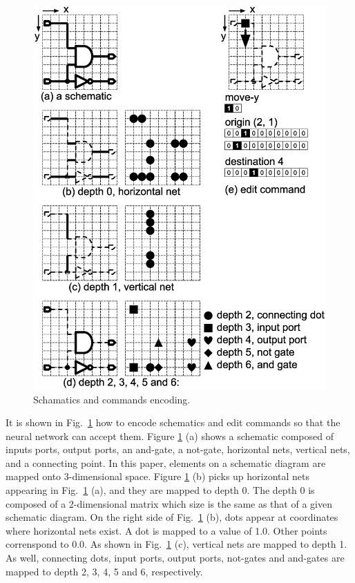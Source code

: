 \documentclass[twocolumn]{article}
\begin{document}
\begin{figure}[!tp]
 \begin{center}
  \begin{minipage}{\hsize}
   \includegraphics[width=\hsize]{fig/encode_02.eps}
   \caption{Schamatics and commands encoding.}
   \label{fig:encode}
  \end{minipage}
 \end{center}
\end{figure}

It is shown in Fig.\ \ref{fig:encode} how to encode
schematics and edit commands so that the neural network can accept them.
Figure \ref{fig:encode} (a) shows a schematic composed of
inputs ports, output ports, an and-gate, a not-gate,
horizontal nets, vertical nets, and a connecting point.
In this paper, elements on a schematic diagram are
mapped onto 3-dimensional space.
Figure \ref{fig:encode} (b) picks up horizontal nets appearing
in Fig.\ \ref{fig:encode} (a), and they are mapped to depth 0.
The depth 0 is composed of a 2-dimensional matrix which size is the same
as that of a given schematic diagram.
On the right side of Fig.\ \ref{fig:encode} (b),
dots appear at coordinates where horizontal nets exist.
A dot is mapped to a value of 1.0.
Other points correnspond to 0.0.
As shown in Fig.\ \ref{fig:encode} (c),
vertical nets are mapped to depth 1.
As well, connecting dots, input ports, output ports, not-gates and and-gates
are mapped to depth 2, 3, 4, 5 and 6, respectively.
\end{document}
